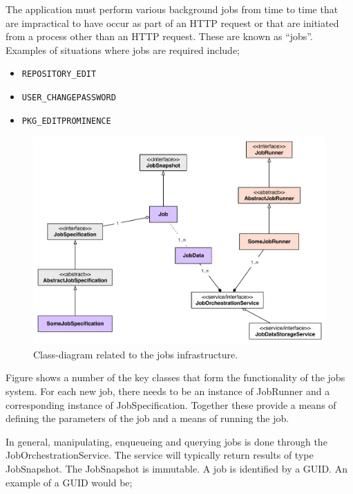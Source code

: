 The application must perform various background jobs from time to time that are impractical to have occur as part of an HTTP request or that are initiated from a process other than an HTTP request.  These are known as ``jobs''.  Examples of situations where jobs are required include;

\begin{itemize}
\item {\tt REPOSITORY\_EDIT}
\item {\tt USER\_CHANGEPASSWORD}
\item {\tt PKG\_EDITPROMINENCE}
\end{itemize}

\begin{figure}
\centering
\vspace{.2in}
\includegraphics[width=6in]{img-jobsuml.pdf}
\caption{Class-diagram related to the jobs infrastructure.}
\label{\thefigure}
\end{figure}

Figure {\thefigure} shows a number of the key classes that form the functionality of the jobs system.  For each new job, there needs to be an instance of JobRunner and a corresponding instance of JobSpecification.  Together these provide a means of defining the parameters of the job and a means of running the job.

In general, manipulating, enqueueing and querying jobs is done through the JobOrchestrationService.  The service will typically return results of type JobSnapshot.  The JobSnapshot is immutable.  A job is identified by a GUID.  An example of a GUID would be;


